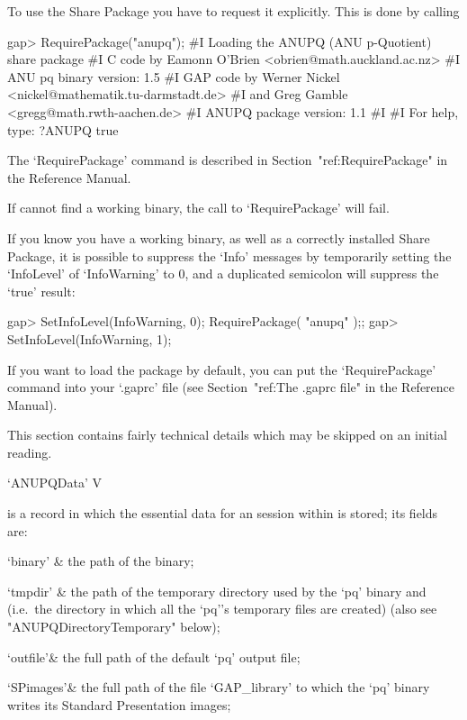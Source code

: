 To use the {\ANUPQ} Share Package you have to request it explicitly. This
is done by calling

\beginexample
gap> RequirePackage("anupq");
#I    Loading the ANUPQ (ANU p-Quotient) share package
#I    C code by  Eamonn O'Brien <obrien@math.auckland.ac.nz>
#I                ANU pq binary version: 1.5
#I    GAP code by Werner Nickel <nickel@mathematik.tu-darmstadt.de>
#I            and   Greg Gamble  <gregg@math.rwth-aachen.de>
#I                ANUPQ package version: 1.1
#I  
#I                For help, type: ?ANUPQ
true
\endexample

The `RequirePackage' command is described in Section~"ref:RequirePackage"
in the {\GAP} Reference Manual.

If {\GAP} cannot find a working binary, the call to `RequirePackage' will
fail.

If you know you have a working {\ANUPQ} binary, as well  as  a  correctly
installed {\ANUPQ} Share Package, it is possible to suppress  the  `Info'
messages by temporarily setting the `InfoLevel' of  `InfoWarning'  to  0,
and a duplicated semicolon will suppress the `true' result:

\beginexample
gap> SetInfoLevel(InfoWarning, 0); RequirePackage( "anupq" );;
gap> SetInfoLevel(InfoWarning, 1);
\endexample

If you want to load the {\ANUPQ} package by  default,  you  can  put  the
`RequirePackage' command into your `.gaprc'  file  (see  Section~"ref:The
.gaprc file" in the {\GAP} Reference Manual).


This section contains fairly technical details which may be skipped on an
initial reading.

\>`ANUPQData' V

is a {\GAP} record in which the essential data for  an  {\ANUPQ}  session
within {\GAP} is stored; its fields are:

\beginitems

\quad`binary' & the path of the {\ANUPQ} binary;

\quad`tmpdir' & the path of the temporary  directory  used  by  the  `pq'
binary and {\GAP} (i.e.~the directory in which all the  `pq''s  temporary
files are created) (also see "ANUPQDirectoryTemporary" below);

\quad`outfile'& the full path of the default `pq' output  file;

\quad`SPimages'& the full path of the file  `GAP_library'  to  which  the
`pq' binary writes its Standard Presentation images;

